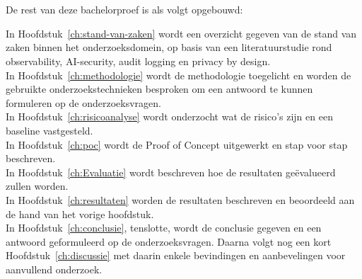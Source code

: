 \section{}%
\label{sec:opzet-bachelorproef}

De rest van deze bachelorproef is als volgt opgebouwd:

In Hoofdstuk~\ref{ch:stand-van-zaken} wordt een overzicht gegeven van de stand van zaken binnen het onderzoeksdomein, op basis van een literatuurstudie rond observability, AI-security, audit logging en privacy by design.\\

In Hoofdstuk~\ref{ch:methodologie} wordt de methodologie toegelicht en worden de gebruikte onderzoekstechnieken besproken om een antwoord te kunnen formuleren op de onderzoeksvragen.\\

In Hoofdstuk~\ref{ch:risicoanalyse} wordt onderzocht wat de risico's zijn en een baseline vastgesteld.\\

In Hoofdstuk~\ref{ch:poc} wordt de Proof of Concept uitgewerkt en stap voor stap beschreven.\\

In Hoofdstuk~\ref{ch:Evaluatie} wordt beschreven hoe de resultaten geëvalueerd zullen worden.\\

In Hoofdstuk~\ref{ch:resultaten} worden de resultaten beschreven en beoordeeld aan de hand van het vorige hoofdstuk.\\

In Hoofdstuk~\ref{ch:conclusie}, tenslotte, wordt de conclusie gegeven en een antwoord geformuleerd op de onderzoeksvragen. Daarna volgt nog een kort Hoofdstuk~\ref{ch:discussie} met daarin enkele bevindingen en aanbevelingen voor aanvullend onderzoek.
